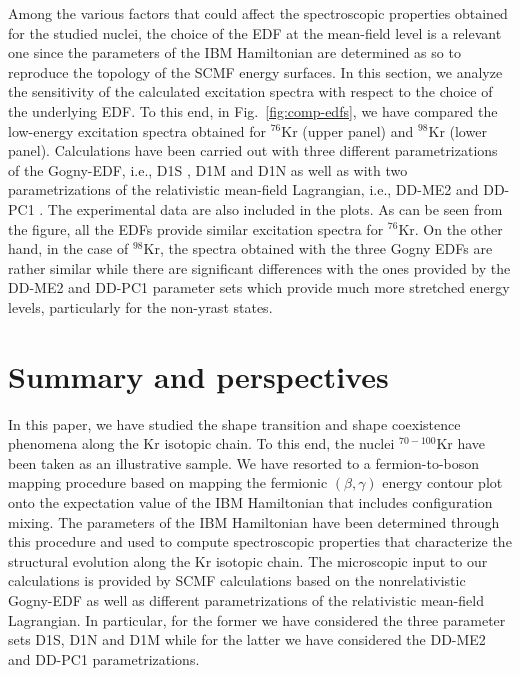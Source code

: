 \documentclass[twocolumn,showpacs,amsmath,amssymb,superscriptaddress]{revtex4-1}
\begin{document}
Among the various factors that could affect the spectroscopic 
properties obtained for the studied nuclei, the choice of the EDF at 
the mean-field level is a relevant one since the parameters of the IBM 
Hamiltonian are determined as so to reproduce the topology of the SCMF 
energy surfaces. In this section, we analyze the sensitivity of the 
calculated excitation spectra with respect to the choice of the 
underlying EDF. To this end, in Fig.~\ref{fig:comp-edfs}, we have 
compared the low-energy excitation spectra obtained for $^{76}$Kr 
(upper panel) and $^{98}$Kr (lower panel). Calculations have been 
carried out with three different parametrizations of the Gogny-EDF, 
i.e., D1S \cite{D1S}, D1M \cite{D1M} and D1N \cite{D1N} as well as with 
two parametrizations of the relativistic mean-field Lagrangian, i.e., 
DD-ME2 \cite{lalazissis2005} and DD-PC1 \cite{DDPC1}. The  experimental 
data are also included in the  plots. As can be seen from the figure, 
all the EDFs provide similar excitation spectra for $^{76}$Kr. On the 
other hand, in the case of $^{98}$Kr, the spectra obtained with the 
three Gogny EDFs are rather similar while there are significant 
differences with the ones provided by the DD-ME2 and DD-PC1 parameter 
sets which provide much more stretched energy levels, particularly for 
the non-yrast states.

  

\section{Summary and perspectives\label{sec:summary}}



In this paper, we have studied the shape transition and shape 
coexistence phenomena  along the Kr isotopic chain. To this end, the 
nuclei $^{70-100}$Kr have been taken as an illustrative sample. We have 
resorted to a fermion-to-boson mapping procedure based on mapping the 
fermionic $(\beta,\gamma)$ energy contour plot onto the expectation 
value of the IBM Hamiltonian that includes configuration mixing. The 
parameters of the IBM Hamiltonian have been determined through this 
procedure and used to compute spectroscopic properties that 
characterize the structural evolution along the Kr isotopic chain. The 
microscopic input to our calculations is provided by SCMF calculations 
based on the nonrelativistic Gogny-EDF as well as different 
parametrizations of the relativistic mean-field Lagrangian. In 
particular, for the former we have considered the three parameter sets 
D1S, D1N and D1M while for the latter we have considered the DD-ME2 and 
DD-PC1 parametrizations.
\end{document}

